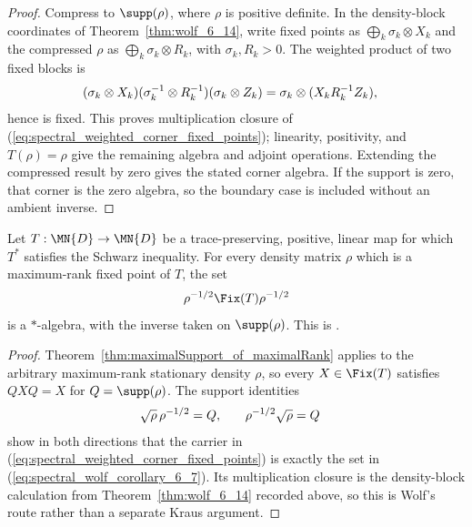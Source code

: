 \begin{proof}\leanok
    Compress to $\supp(\rho)$, where $\rho$ is positive definite.  In the
    density-block coordinates of Theorem~\ref{thm:wolf_6_14}, write fixed
    points as
    $\bigoplus_k\sigma_k\otimes X_k$ and the compressed $\rho$ as
    $\bigoplus_k\sigma_k\otimes R_k$, with $\sigma_k,R_k>0$.  The weighted
    product of two fixed blocks is
    \begin{align}
        (\sigma_k\otimes X_k)
        (\sigma_k^{-1}\otimes R_k^{-1})
        (\sigma_k\otimes Z_k)
        &=\sigma_k\otimes(X_kR_k^{-1}Z_k),
        \notag
    \end{align}
    hence is fixed.  This proves multiplication closure of
    (\ref{eq:spectral_weighted_corner_fixed_points}); linearity, positivity,
    and $T(\rho)=\rho$ give the remaining algebra and adjoint operations.
    Extending the compressed result by zero gives the stated corner algebra.
    If the support is zero, that corner is the zero algebra, so the boundary
    case is included without an ambient inverse.
\end{proof}

\begin{theorem}%
    \label{thm:wolf_corollary_6_7}
    \leanok
    Let $T:\MN{D}\to\MN{D}$ be a trace-preserving, positive, linear map for
    which $T^*$ satisfies the Schwarz inequality.  For every density matrix
    $\rho$ which is a maximum-rank fixed point of $T$, the set
    \begin{align}
        \rho^{-1/2}\Fix(T)\rho^{-1/2}
        \label{eq:spectral_wolf_corollary_6_7}
    \end{align}
    is a $*$-algebra, with the inverse taken on $\supp(\rho)$.
    This is \cite[Corollary~6.7]{Wolf2012Quantum}.
\end{theorem}

\begin{proof}\leanok
    Theorem~\ref{thm:maximalSupport_of_maximalRank} applies to the arbitrary
    maximum-rank stationary density $\rho$, so every $X\in\Fix(T)$ satisfies
    $QXQ=X$ for $Q=\supp(\rho)$.  The support identities
    \begin{align}
        \sqrt{\rho}\,\rho^{-1/2}=Q,
        &\qquad
        \rho^{-1/2}\sqrt{\rho}=Q
        \notag
    \end{align}
    show in both directions that the carrier in
    (\ref{eq:spectral_weighted_corner_fixed_points}) is exactly the set in
    (\ref{eq:spectral_wolf_corollary_6_7}).  Its multiplication closure is
    the density-block calculation from Theorem~\ref{thm:wolf_6_14} recorded
    above, so this is Wolf's route rather than a separate Kraus argument.
\end{proof}

